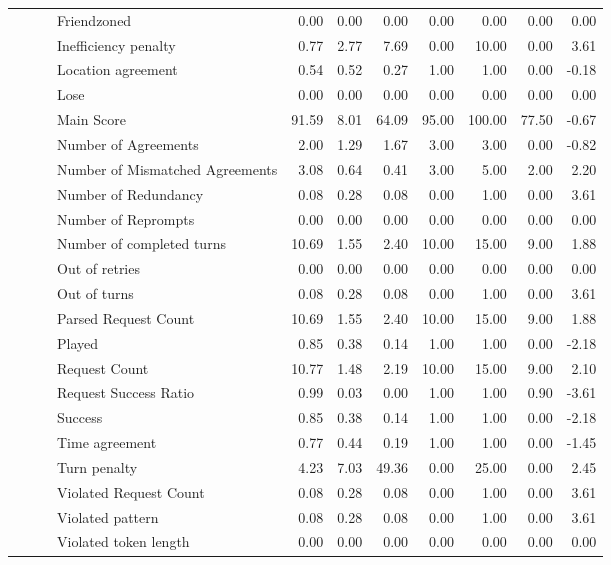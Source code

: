 \begin{tabular}{llllrrrrrrr}
 &  &  & Friendzoned & 0.00 & 0.00 & 0.00 & 0.00 & 0.00 & 0.00 & 0.00 \\
 &  &  & Inefficiency penalty & 0.77 & 2.77 & 7.69 & 0.00 & 10.00 & 0.00 & 3.61 \\
 &  &  & Location agreement & 0.54 & 0.52 & 0.27 & 1.00 & 1.00 & 0.00 & -0.18 \\
 &  &  & Lose & 0.00 & 0.00 & 0.00 & 0.00 & 0.00 & 0.00 & 0.00 \\
 &  &  & Main Score & 91.59 & 8.01 & 64.09 & 95.00 & 100.00 & 77.50 & -0.67 \\
 &  &  & Number of Agreements & 2.00 & 1.29 & 1.67 & 3.00 & 3.00 & 0.00 & -0.82 \\
 &  &  & Number of Mismatched Agreements & 3.08 & 0.64 & 0.41 & 3.00 & 5.00 & 2.00 & 2.20 \\
 &  &  & Number of Redundancy & 0.08 & 0.28 & 0.08 & 0.00 & 1.00 & 0.00 & 3.61 \\
 &  &  & Number of Reprompts & 0.00 & 0.00 & 0.00 & 0.00 & 0.00 & 0.00 & 0.00 \\
 &  &  & Number of completed turns & 10.69 & 1.55 & 2.40 & 10.00 & 15.00 & 9.00 & 1.88 \\
 &  &  & Out of retries & 0.00 & 0.00 & 0.00 & 0.00 & 0.00 & 0.00 & 0.00 \\
 &  &  & Out of turns & 0.08 & 0.28 & 0.08 & 0.00 & 1.00 & 0.00 & 3.61 \\
 &  &  & Parsed Request Count & 10.69 & 1.55 & 2.40 & 10.00 & 15.00 & 9.00 & 1.88 \\
 &  &  & Played & 0.85 & 0.38 & 0.14 & 1.00 & 1.00 & 0.00 & -2.18 \\
 &  &  & Request Count & 10.77 & 1.48 & 2.19 & 10.00 & 15.00 & 9.00 & 2.10 \\
 &  &  & Request Success Ratio & 0.99 & 0.03 & 0.00 & 1.00 & 1.00 & 0.90 & -3.61 \\
 &  &  & Success & 0.85 & 0.38 & 0.14 & 1.00 & 1.00 & 0.00 & -2.18 \\
 &  &  & Time agreement & 0.77 & 0.44 & 0.19 & 1.00 & 1.00 & 0.00 & -1.45 \\
 &  &  & Turn penalty & 4.23 & 7.03 & 49.36 & 0.00 & 25.00 & 0.00 & 2.45 \\
 &  &  & Violated Request Count & 0.08 & 0.28 & 0.08 & 0.00 & 1.00 & 0.00 & 3.61 \\
 &  &  & Violated pattern & 0.08 & 0.28 & 0.08 & 0.00 & 1.00 & 0.00 & 3.61 \\
 &  &  & Violated token length & 0.00 & 0.00 & 0.00 & 0.00 & 0.00 & 0.00 & 0.00 \\

\end{tabular}
